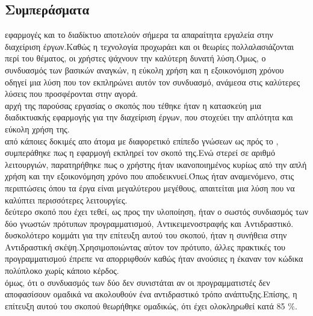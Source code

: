 \subsection*{Συμπεράσματα}
 εφαρμογές και το διαδίκτυο αποτελούν σήμερα τα απαραίτητα εργαλεία στην διαχείριση έργων.Καθώς η τεχνολογία προχωράει και οι θεωρίες πολλαλασιάζονται περί του θέματος, οι χρήστες ψάχνουν την καλύτερη δυνατή λύση.Όμως, ο συνδυασμός των βασικών αναγκών, η εύκολη χρήση και η εξοικονόμιση χρόνου οδηγεί μια λύση που τον εκπληρώνει αυτόν τον συνδυασμό, ανάμεσα στις καλύτερες λύσεις που προσφέρονται στην αγορά.\\
 αρχή της παρούσας εργασίας ο σκοπός που τέθηκε ήταν η κατασκεύη μια διαδικτυακής εφαρμογής για την διαχείριση έργων, που στοχεύει την απλότητα και εύκολη χρήση της.\\
 από κάποιες δοκιμές απο άτομα με διαφορετικό επίπεδο γνώσεων ως πρός το , συμπεράθηκε πως η εφαρμογή εκπληρεί τον σκοπό της.Ενώ στερεί σε αριθμό λειτουργιών, παρατηρήθηκε πως ο χρήστης ήταν ικανοποιημένος κυρίως από την απλή χρήση και την εξοικονόμηση χρόνο που αποδεικνυεί.Όπως ήταν αναμενόμενο, στις περιπτώσεις όπου τα έργα είναι μεγαλύτερου μεγέθους, απαιτείται μια λύση που να καλύπτει περισσότερες λειτουργίες.\\
 δεύτερο σκοπό που έχει τεθεί, ως προς την υλοποίηση, ήταν ο σωστός συνδιασμός των δύο γνωστών πρότυπων προγραμματισμού, Αντικειμενοστραφής και Αντιδραστικό.\\
 δυσκολότερο κομμάτι για την επίτευξη αυτού του σκοπού, ήταν η συνήθεια στην Αντιδραστική σκέψη.Χρησιμοποιώντας αύτον τον πρότυπο, άλλες πρακτικές του προγραμματισμού έπρεπε να απορριφθούν καθώς ήταν ανούσιες η έκαναν τον κώδικα πολύπλοκο χωρίς κάποιο κέρδος.\\
 όμως, ότι ο συνδυασμός των δύο δεν συνιστάται αν οι προγραμματιστές δεν αποφασίσουν ομαδικά να ακολουθούν ένα αντιδραστικό τρόπο ανάπτυξης.Επίσης, η επίτευξη αυτού του σκοπού θεωρήθηκε ομαδικώς, ότι έχει ολοκληρωθεί κατά 85 $\%$.\\

